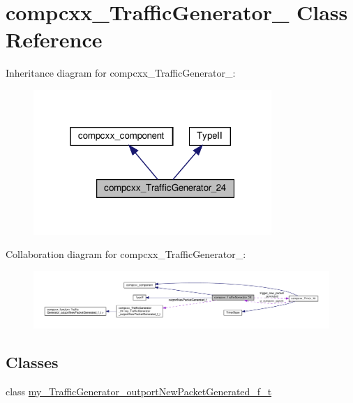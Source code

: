 \hypertarget{classcompcxx__TrafficGenerator__24}{}\section{compcxx\+\_\+\+Traffic\+Generator\+\_ Class Reference}
\label{classcompcxx__TrafficGenerator__24}


Inheritance diagram for compcxx\+\_\+\+Traffic\+Generator\+\_\+:\nopagebreak
\begin{figure}[H]
\begin{center}
\leavevmode
\includegraphics[width=256pt]{classcompcxx__TrafficGenerator__24__inherit__graph}
\end{center}
\end{figure}


Collaboration diagram for compcxx\+\_\+\+Traffic\+Generator\+\_\+:\nopagebreak
\begin{figure}[H]
\begin{center}
\leavevmode
\includegraphics[width=350pt]{classcompcxx__TrafficGenerator__24__coll__graph}
\end{center}
\end{figure}
\subsection*{Classes}
\begin{DoxyCompactItemize}
\item 
class \hyperlink{classcompcxx__TrafficGenerator__24_1_1my__TrafficGenerator__outportNewPacketGenerated__f__t}{my\+\_\+\+Traffic\+Generator\+\_\+outport\+New\+Packet\+Generated\+\_\+f\+\_\+t}
\end{DoxyCompactItemize}
